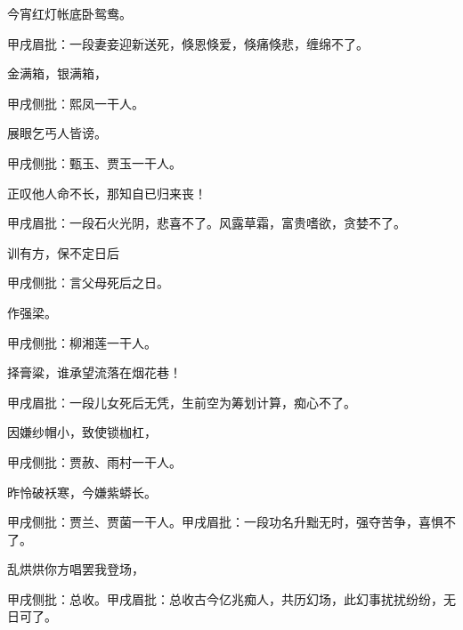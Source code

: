 \begin{poem}
    \begin{pl}
        今宵红灯帐底卧鸳鸯。\end{pl}\begin{note}甲戌眉批：一段妻妾迎新送死，倏恩倏爱，倏痛倏悲，缠绵不了。\end{note}

    \begin{pl}
        金满箱，银满箱，\end{pl}\begin{note}甲戌侧批：熙凤一干人。\end{note}

    \begin{pl}
        展眼乞丐人皆谤。\end{pl}\begin{note}甲戌侧批：甄玉、贾玉一干人。\end{note}

    \begin{pl}
        正叹他人命不长，那知自已归来丧！\end{pl}\begin{note}甲戌眉批：一段石火光阴，悲喜不了。风露草霜，富贵嗜欲，贪婪不了。\end{note}

    \begin{pl}
        训有方，保不定日后\end{pl}\begin{note}甲戌侧批：言父母死后之日。\end{note}作强梁。\begin{note}甲戌侧批：柳湘莲一干人。\end{note}

    \begin{pl}
        择膏粱，谁承望流落在烟花巷！\end{pl}\begin{note}甲戌眉批：一段儿女死后无凭，生前空为筹划计算，痴心不了。\end{note}

    \begin{pl}
        因嫌纱帽小，致使锁枷杠，\end{pl}\begin{note}甲戌侧批：贾赦、雨村一干人。\end{note}

    \begin{pl}
        昨怜破袄寒，今嫌紫蟒长。\end{pl}\begin{note}甲戌侧批：贾兰、贾菌一干人。甲戌眉批：一段功名升黜无时，强夺苦争，喜惧不了。\end{note}
    \begin{pl}
        乱烘烘你方唱罢我登场，\end{pl}\begin{note}甲戌侧批：总收。甲戌眉批：总收古今亿兆痴人，共历幻场，此幻事扰扰纷纷，无日可了。\end{note}


\end{poem}
